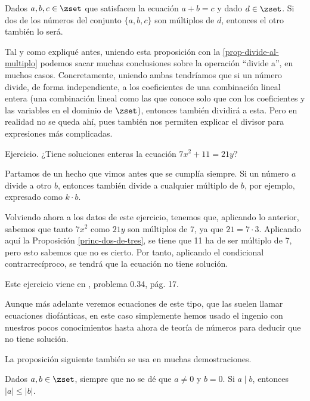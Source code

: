 \begin{proposition}\label{princ-dos-de-tres}
  Dados $a, b, c \in \zset$ que satisfacen la ecuación $a + b = c$ y dado $d
  \in \zset$. Si dos de los números del conjunto $\{a, b, c\}$ son múltiplos
  de $d$, entonces el otro también lo será.
\end{proposition}

Tal y como expliqué antes, uniendo esta proposición con la
\ref{prop-divide-al-multiplo} podemos sacar muchas conclusiones sobre la
operación ``divide a'', en muchos casos. Concretamente, uniendo ambas
tendríamos que si un número divide, de forma independiente, a los
coeficientes de una combinación lineal entera (una combinación lineal como
las que conoce solo que con los coeficientes y las variables en el dominio
de $\zset$), entonces también dividirá a esta. Pero en realidad no se queda
ahí, pues también nos permiten explicar el divisor para expresiones más
complicadas.

Ejercicio. ¿Tiene soluciones enteras la ecuación $7x^2 + 11 = 21y$?

Partamos de un hecho que vimos antes que se cumplía siempre. Si un número
$a$ divide a otro $b$, entonces también divide a cualquier múltiplo de $b$,
por ejemplo, expresado como $k \cdot b$.

Volviendo ahora a los datos de este ejercicio, tenemos que, aplicando lo
anterior, sabemos que tanto $7x^2$ como $21y$ son múltiplos de 7, ya que $21
= 7 \cdot 3$. Aplicando aquí la Proposición \ref{princ-dos-de-tres}, se
tiene que 11 ha de ser múltiplo de 7, pero esto sabemos que no es cierto.
Por tanto, aplicando el condicional contrarrecíproco, se tendrá que la
ecuación no tiene solución.

Este ejercicio viene en \cite{weissman}, problema 0.34, pág. 17.

Aunque más adelante veremos ecuaciones de este tipo, que las suelen llamar
ecuaciones diofánticas, en este caso simplemente hemos usado el ingenio con
nuestros pocos conocimientos hasta ahora de teoría de números para deducir
que no tiene solución.

La proposición siguiente también se usa en muchas demostraciones.

\begin{proposition}\label{prop-factor-men}
  Dados $a, b \in \zset$, siempre que no se dé que $a \neq 0$ y $b = 0$. Si
  $a \mid b$, entonces $|a| \leq |b|$.
\end{proposition}

